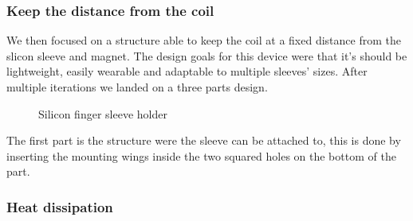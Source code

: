 \subsubsection{Keep the distance from the coil}
We then focused on a structure able to keep the coil at a fixed distance from the slicon sleeve and magnet.
The design goals for this device were that it's should be lightweight, easily wearable and adaptable to multiple sleeves' sizes.
After multiple iterations we landed on a three parts design.
\begin{figure}
    \centering
    \caption{Silicon finger sleeve holder}
    \label{fig: sleeve_holder}
\end{figure}
The first part is the structure were the sleeve can be attached to, this is done by inserting the mounting wings inside the two squared holes on the bottom of the part.

\subsubsection{Heat dissipation}

